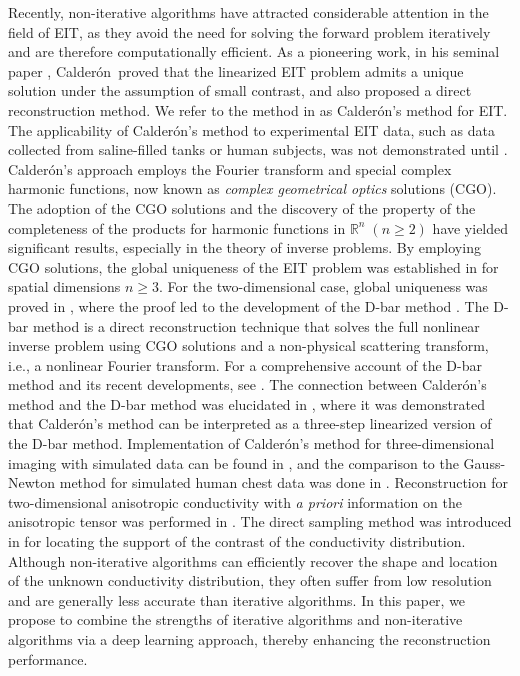 \documentclass[11pt]{article}
\newcommand{\R}{{\mathbb R}}
\newcommand{\Calderon}{Calder\'{o}n}
\begin{document}
Recently, non-iterative algorithms have attracted considerable attention in the field of EIT, as they avoid the need for solving the forward problem iteratively and are therefore computationally efficient. 
As a pioneering work, in his seminal paper \cite{CAP80}, \Calderon\ proved that the linearized EIT problem admits a unique solution under the assumption of small contrast, and also proposed a direct reconstruction method. 
We refer to the method in \cite{CAP80} as \Calderon's method for EIT. 
The applicability of \Calderon's method to experimental EIT data, such as data collected from saline-filled tanks or human subjects, was not demonstrated until \cite{BJM08}. 
\Calderon's approach employs the Fourier transform and special complex harmonic functions, now known as \textit{complex geometrical optics} solutions (CGO). 
The adoption of the CGO solutions and the discovery of the property of the completeness of the products for harmonic functions in $\R^n\; (n\geq 2)$ have yielded significant results, especially in the theory of inverse problems.
By employing CGO solutions, the global uniqueness of the EIT problem was established in \cite{SJU87} for spatial dimensions $n \geq 3$. 
For the two-dimensional case, global uniqueness was proved in \cite{NAI96}, where the proof led to the development of the D-bar method \cite{SSM00, MJL03}. 
The D-bar method is a direct reconstruction technique that solves the full nonlinear inverse problem using CGO solutions and a non-physical scattering transform, i.e., a nonlinear Fourier transform. 
For a comprehensive account of the D-bar method and its recent developments, see \cite{MJL12, MJL20}.
The connection between \Calderon's method and the D-bar method was elucidated in \cite{KKL07, SKM20}, where it was demonstrated that \Calderon's method can be interpreted as a three-step linearized version of the D-bar method. 
Implementation of \Calderon's method for three-dimensional imaging with simulated data can be found in \cite{SKA21}, and the comparison to the Gauss-Newton method for simulated human chest data was done in \cite{SKA24}. 
Reconstruction for two-dimensional anisotropic conductivity with \textit{a priori} information on the anisotropic tensor was performed in \cite{MRL20}.
The direct sampling method was introduced in \cite{CYT14} for locating the support of the contrast of the conductivity distribution. 
Although non-iterative algorithms can efficiently recover the shape and location of the unknown conductivity distribution, they often suffer from low resolution and are generally less accurate than iterative algorithms.
In this paper, we propose to combine the strengths of iterative algorithms and non-iterative algorithms via a deep learning approach, thereby enhancing the reconstruction performance.
\end{document}
